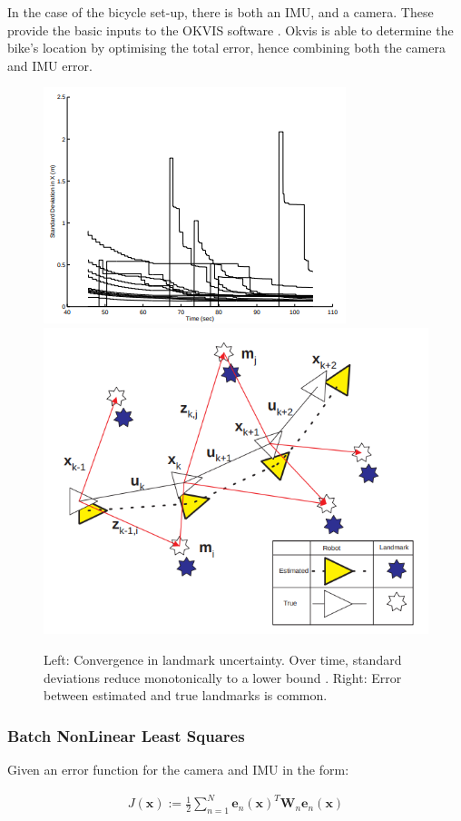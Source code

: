 \documentclass[11pt,twoside]{report}
\begin{document}
In the case of the bicycle set-up, there is both an IMU, and a camera. These provide the basic inputs to the OKVIS software \cite{Okvis_1}. Okvis is able to determine the bike's location by optimising the total error, hence combining both the camera and IMU error.

\noindent \begin{figure}[h!]
	\includegraphics[width = 0.5\hsize]{figures/convergence_landmark_uncertainty.png}
	\includegraphics[width = 0.5\hsize]{figures/ess_slam.png}
	\caption{Left: Convergence in landmark uncertainty.  Over time, standard deviations reduce monotonically to a lower bound \cite{F_Durr_Pt1}. Right: Error between estimated and true landmarks is common.}
	\label{slam_prob_fig}
\end{figure}


\subsubsection{Batch NonLinear Least Squares}

Given an error function for the camera and IMU in the form:

\begin{equation}
\begin{aligned}
J(\mathbf{x}) := \frac{1}{2} \sum_{n=1}^{N} \textbf{e}_{n} (\textbf{x})^{T} \textbf{W}_{n} \textbf{e}_{n}(\textbf{x}) 
\end{aligned}
\end{equation} 
\end{document}
